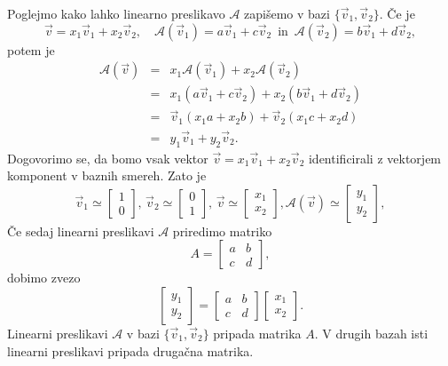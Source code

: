 \documentclass[GmVic, tisk]{gv}
\begin{document}
Poglejmo kako lahko linearno preslikavo $\mathcal A$ zapišemo v bazi  $\{\vec{v}_1, \vec{v}_2 \}$. Če je 
\begin{equation}\label{enačba o preslikavi A}
\vec v =x_1 \vec{v}_1 + x_2\vec{v}_2, \quad \mathcal A(\vec v_1)=a\vec{v}_1+ c \vec{v}_2\, \mbox{  in  }\,
\mathcal A(\vec v_2)=b\vec{v}_1+ d \vec{v}_2 ,
\end{equation}
potem je 
\begin{eqnarray*}
\mathcal A (\vec v)&=& x_1\mathcal A(\vec v_1) + x_2 \mathcal A(\vec v_2)\\
			&=& x_1(a\vec{v}_1+ c \vec{v}_2) + x_2(b\vec{v}_1+ d \vec{v}_2) \\
			&=& \vec{v}_1(x_1a+x_2b) + \vec{v}_2 (x_1c+x_2d)\\
			&=& y_1 \vec{v}_1 + y_2 \vec{v}_2.
\end{eqnarray*}
Dogovorimo se, da bomo vsak vektor $\vec v= x_1 \vec{v}_1 + x_2\vec{v}_2$ identificirali z vektorjem komponent v baznih smereh. Zato je
  $$\vec v_1 \simeq \begin{bmatrix}
         1\\
         0
      \end{bmatrix}, \, 
\vec v_2 \simeq \begin{bmatrix}
         0\\
         1
      \end{bmatrix},\, 
\vec v \simeq \begin{bmatrix}
         x_1\\
         x_2
      \end{bmatrix},
\mathcal A(\vec v) \simeq \begin{bmatrix}
         y_1\\
         y_2
      \end{bmatrix}, 
$$
%
Če sedaj linearni preslikavi $\mathcal A$ priredimo matriko 
$$A=
     \begin{bmatrix}
         a&b\\
         c&d
      \end{bmatrix}, $$
dobimo zvezo 
$$\begin{bmatrix}
         y_1\\
         y_2
      \end{bmatrix} =
 \begin{bmatrix}
         a&b\\
         c&d
      \end{bmatrix} 
 \begin{bmatrix}
         x_1\\
         x_2
      \end{bmatrix}.
$$
Linearni preslikavi $\mathcal A$ v bazi $\{\vec v_1,\vec v_2\}$ pripada matrika $A$. V drugih bazah isti linearni preslikavi pripada drugačna matrika.
\end{document}
